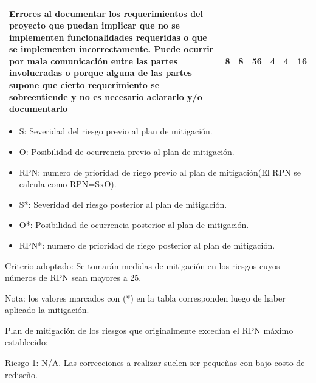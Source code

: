 \documentclass[11pt]{charter}
\begin{document}
\begin{table}[H]
\begin{tabularx}{\linewidth}{@{}|X|c|c|c|c|c|c|@{}}
Errores al documentar los requerimientos del proyecto que puedan implicar que no se implementen funcionalidades requeridas o que se implementen incorrectamente. Puede ocurrir por mala comunicación entre las partes involucradas o porque alguna de las partes supone que cierto requerimiento se sobreentiende y no es necesario aclararlo y/o documentarlo
& 8 & 8 & 56 & 4   &  4  &  16    \\ \hline
       
\end{tabularx}
\end{table}

\begin{itemize}
\item S: Severidad del riesgo previo al plan de mitigación.
\item O: Posibilidad de ocurrencia previo al plan de mitigación. 
\item RPN: numero de prioridad de riego previo al plan de mitigación(El RPN se calcula como RPN=SxO). 
\end{itemize}  

\begin{itemize}
\item S*: Severidad del riesgo posterior al plan de mitigación.
\item O*: Posibilidad de ocurrencia posterior al plan de mitigación. 
\item RPN*: numero de prioridad de riego posterior al plan de mitigación. 
\end{itemize}  

Criterio adoptado: 
Se tomarán medidas de mitigación en los riesgos cuyos números de RPN sean mayores a 25.

Nota: los valores marcados con (*) en la tabla corresponden luego de haber aplicado la mitigación.

Plan de mitigación de los riesgos que originalmente excedían el RPN máximo establecido:
 
Riesgo 1: N/A. Las correcciones a realizar suelen ser pequeñas con bajo costo de rediseño.
\end{document}
